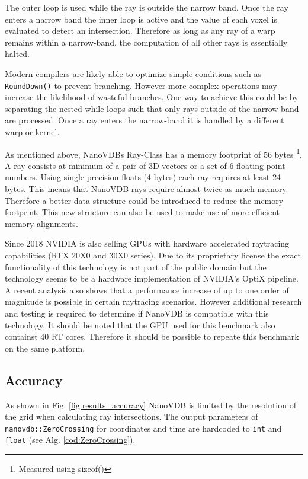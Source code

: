 The outer loop is used while the ray is outside the narrow band. Once the ray enters a narrow band the inner loop is active and the value of each voxel is evaluated to detect an intersection.
Therefore as long as any ray of a warp remains within a narrow-band, the computation of all other rays is essentially halted.

Modern compilers are likely able to optimize simple conditions such as \texttt{RoundDown()} to prevent branching.
However more complex operations may increase the likelihood of wasteful branches.
One way to achieve this could be by separating the nested while-loops such that only rays outside of the narrow band are processed.
Once a ray enters the narrow-band it is handled by a different warp or kernel.

As mentioned above, NanoVDBs Ray-Class has a memory footprint of 56 bytes \footnote{Measured using sizeof()}.
A ray consists at minimum of a pair of 3D-vectors or a set of 6 floating point numbers.
Using single precision floats (4 bytes) each ray requires at least 24 bytes.
This means that NanoVDB rays require almost twice as much memory.
Therefore a better data structure could be introduced to reduce the memory footprint.
This new structure can also be used to make use of more efficient memory alignments.


Since 2018 NVIDIA is also selling GPUs with hardware accelerated raytracing capabilities (RTX 20X0 and 30X0 series).
Due to its proprietary license the exact functionality of this technology is not part of the public domain but the technology seems to be a hardware implementation of NVIDIA's OptiX pipeline.
A recent analysis \cite{sanzharov2020survey} also shows that a performance increase of up to one order of magnitude is possible in certain raytracing scenarios.
However additional research and testing is required to determine if NanoVDB is compatible with this technology.
It should be noted that the GPU used for this benchmark also containst 40 RT cores.
Therefore it should be possible to repeate this benchmark on the same platform.

\subsection{Accuracy}
As shown in Fig. \ref{fig:results_accuracy} NanoVDB is limited by the resolution of the grid when calculating ray intersections.
The output parameters of \texttt{nanovdb::ZeroCrossing} for coordinates and time are hardcoded to \texttt{int} and \texttt{float} (see Alg. \ref{cod:ZeroCrossing}).


